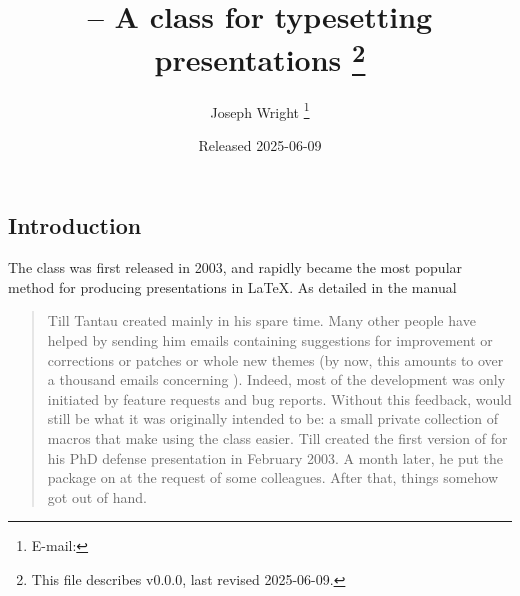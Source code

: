 \documentclass{l3doc}
\makeatletter
\let\acro\@firstofone
\def\filedate{2025-06-09}
\def\fileversion{v0.0.0}
\makeatother
\begin{document}
\title{%
   -- A class for typesetting presentations%
  \thanks{This file describes \fileversion,
    last revised \filedate.}%
}

\author{%
  Joseph Wright%
  \thanks{%
    E-mail: %
  }%
}

\date{Released \filedate}

\maketitle

\tableofcontents

\begin{documentation}

\section{Introduction%
  \label{sec:intro}}

The  class was first released in 2003, and rapidly became the
most popular method for producing presentations in \LaTeX{}. As detailed in
the  manual
\begin{quotation}
  Till Tantau created  mainly in his spare time. Many other people
  have helped by sending him emails containing suggestions for improvement or
  corrections or patches or whole new themes (by now, this amounts to over a
  thousand emails concerning ). Indeed, most of the development was
  only initiated by feature requests and bug reports. Without this feedback,
   would still be what it was originally intended to be: a small
  private collection of macros that make using the  class easier.
  Till created the first version of  for his PhD defense
  presentation in February 2003. A month later, he put the package on
  \acro{ctan} at the request of some colleagues. After that, things somehow got
  out of hand.
\end{quotation}


\end{documentation}
\end{document}
